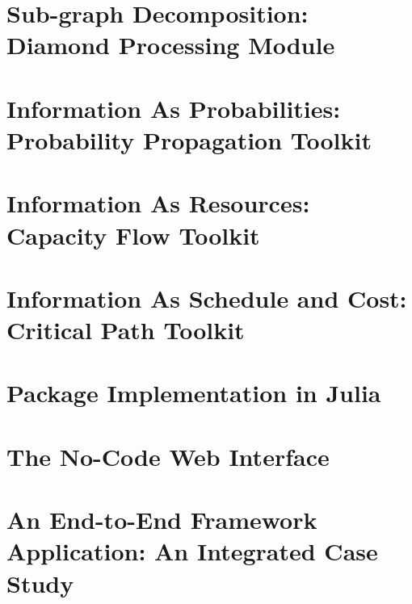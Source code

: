 \documentclass[12pt,a4paper,twoside]{report}
\begin{document}
\chapter{ Sub-graph Decomposition: Diamond Processing Module}
\label{ch:diamond-module}

\chapter{ Information As Probabilities: Probability Propagation Toolkit}
\label{ch:probability-toolkit}
\chapter{ Information As Resources: Capacity Flow Toolkit}
\label{ch:capacity-toolkit}
    
\chapter{ Information As Schedule and Cost: Critical Path Toolkit}
\label{ch:critical-path}

\chapter{ Package Implementation in Julia }
\chapter{ The No-Code Web Interface }
\chapter{An End-to-End Framework Application: An Integrated Case Study }
\end{document}
